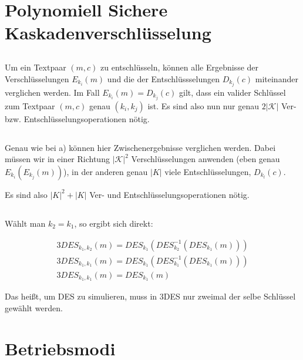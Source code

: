 \documentclass{../crypto}
\date{13. November 2015}
\begin{document}
\maketitle

\section{Polynomiell Sichere Kaskadenverschlüsselung}

\subsection{}
Um ein Textpaar $(m ,c)$ zu entschlüsseln, können alle Ergebnisse der Verschlüsselungen $E_{k_i}(m)$ 
und die der Entschlüssselungen $D_{k_j}(c)$ miteinander verglichen werden. Im Fall $E_{k_i}(m)=D_{k_j}(c)$
gilt, dass ein valider Schlüssel zum Textpaar $(m, c)$ genau $(k_i, k_j)$ ist.
Es sind also nun nur genau $2|\mathcal{K}|$ Ver- bzw. Entschlüsselungsoperationen nötig.

\subsection{}
Genau wie bei a) können hier Zwischenergebnisse verglichen werden. Dabei müssen wir in einer
Richtung $|\mathcal{K}|^2$ Verschlüsselungen anwenden (eben genau $E_{k_i}(E_{k_j}(m))$), in der anderen genau 
$|K|$ viele Entschlüsselungen, $D_{k_l}(c)$.

Es sind also $|K|^2+|K|$ Ver- und Entschlüsselungsoperationen nötig.

\subsection{}
Wählt man $k_2=k_1$, so ergibt sich direkt:

\begin{align*}
    3DES_{k_1,k_2}(m) = DES_{k_1}\left(DES_{k_2}^{-1}\left(DES_{k_1}(m)\right)\right) \\
    3DES_{k_1,k_1}(m) = DES_{k_1}\left(DES_{k_1}^{-1}\left(DES_{k_1}(m)\right)\right) \\
    3DES_{k_1,k_1}(m) = DES_{k_1}\left(m\right)
\end{align*}

Das heißt, um DES zu simulieren, muss in 3DES nur zweimal der selbe Schlüssel gewählt werden.

\section{Betriebsmodi}
\end{document}
